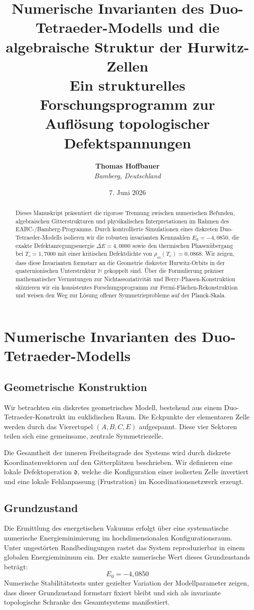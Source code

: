 \documentclass[11pt,a4paper]{article}
\title{\textbf{Numerische Invarianten des Duo-Tetraeder-Modells und die algebraische Struktur der Hurwitz-Zellen}\\
	\large Ein strukturelles Forschungsprogramm zur Auflösung topologischer Defektspannungen}
\author{\textbf{Thomas Hoffbauer} \\
\textit{Bamberg, Deutschland}}
\date{7. Juni 2026}
\newcommand{\Halg}{\mathbb{H}}
\begin{document}
\maketitle

\begin{abstract}
	Dieses Manuskript präsentiert die rigorose Trennung zwischen numerischen Befunden, algebraischen Gitterstrukturen und physikalischen Interpretationen im Rahmen des EABC-/Bamberg-Programms. Durch kontrollierte Simulationen eines diskreten Duo-Tetraeder-Modells isolieren wir die robusten invarianten Kennzahlen $E_0 = -4{,}0850$, die exakte Defektanregungsenergie $\Delta E = 4{,}0000$ sowie den thermischen Phasenübergang bei $T_c = 1{,}7000$ mit einer kritischen Defektdichte von $\rho_m(T_c) = 0{,}0868$. Wir zeigen, dass diese Invarianten formstarr an die Geometrie diskreter Hurwitz-Orbits in der quaternionischen Unterstruktur $\Halg$ gekoppelt sind. Über die Formulierung präziser mathematischer Vermutungen zur Nichtassoziativität und Berry-Phasen-Konstruktion skizzieren wir ein konsistentes Forschungsprogramm zur Fermi-Flächen-Rekonstruktion und weisen den Weg zur Lösung offener Symmetrieprobleme auf der Planck-Skala.
\end{abstract}

\newpage
\tableofcontents
\newpage

\section{Numerische Invarianten des Duo-Tetraeder-Modells}

\subsection{Geometrische Konstruktion}
Wir betrachten ein diskretes geometrisches Modell, bestehend aus einem Duo-Tetraeder-Konstrukt im euklidischen Raum. Die Eckpunkte der elementaren Zelle werden durch das Vierertupel $(A, B, C, E)$ aufgespannt. Diese vier Sektoren teilen sich eine gemeinsame, zentrale Symmetriezelle. 

Die Gesamtheit der inneren Freiheitsgrade des Systems wird durch diskrete Koordinatenvektoren auf den Gitterplätzen beschrieben. Wir definieren eine lokale Defektoperation $\mathfrak{d}$, welche die Konfiguration einer isolierten Zelle invertiert und eine lokale Fehlanpassung (Frustration) im Koordinationsnetzwerk erzeugt.

\subsection{Grundzustand}
Die Ermittlung des energetischen Vakuums erfolgt über eine systematische numerische Energieminimierung im hochdimensionalen Konfigurationsraum. Unter ungestörten Randbedingungen rastet das System reproduzierbar in einem globalen Energieminimum ein. Der exakte numerische Wert dieses Grundzustands beträgt:
\begin{equation}
	E_0 = -4{,}0850
\end{equation}
Numerische Stabilitätstests unter gezielter Variation der Modellparameter zeigen, dass dieser Grundzustand formstarr fixiert bleibt und sich als invariante topologische Schranke des Gesamtsystems manifestiert.
\end{document}
